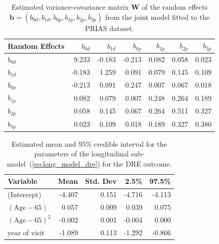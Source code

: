 \begin{table}[!htb]
\begin{center}
\caption{Estimated variance-covariance matrix $\boldsymbol{W}$ of the random effects ${\boldsymbol{b}=(b_{0d},b_{1d},b_{0p}, b_{1p}, b_{2p}, b_{3p})}$ from the joint model fitted to the PRIAS dataset.}
\label{tab:D_matrix}
\begin{tabular}{lrrrrrr}
\hline
\hline
Random Effects    & $b_{0d}$    & $b_{1d}$    & $b_{0p}$    & $b_{1p}$   & $b_{2p}$   & $b_{3p}$ \\
\hline
$b_{0d}$ & 9.233 & -0.183 & -0.213 & 0.082 & 0.058 & 0.023 \\
$b_{1d}$ & -0.183 & 1.259 & 0.091 & 0.079 & 0.145 & 0.109 \\
\hline
$b_{0p}$ & -0.213 & 0.091 & 0.247 & 0.007 & 0.067 & 0.018 \\
$b_{1p}$ & 0.082 & 0.079 & 0.007 & 0.248 & 0.264 & 0.189 \\
$b_{2p}$ & 0.058 & 0.145 & 0.067 & 0.264 & 0.511 & 0.327 \\
$b_{3p}$ & 0.023 & 0.109 & 0.018 & 0.189 & 0.327 & 0.380 \\
\hline
\end{tabular}
\end{center}
\end{table}

\begin{table}[!htb]
\begin{center}
\caption{Estimated mean and 95\% credible interval for the parameters of the longitudinal sub-model~(\ref{eq:long_model_dre}) for the DRE outcome.}
\label{tab:DRE_long}
\begin{tabular}{lrrrr}
\hline
\hline
Variable                         & Mean & Std. Dev & 2.5\%  & 97.5\%   \\
\hline
(Intercept)                      & -4.407 & 0.151 & -4.716 & -4.113 \\
$(\mbox{Age} - 65)$              & 0.057 & 0.009 & 0.039 & 0.075 \\
$(\mbox{Age} - 65)^2$            & -0.002 & 0.001 & -0.004 & 0.000\\
year of visit                   & -1.089 & 0.113 & -1.292 & -0.866 \\
\hline
\end{tabular}
\end{center}
\end{table}

